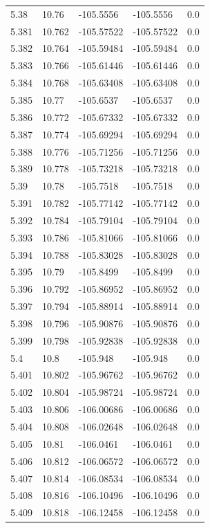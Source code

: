 \begin{tabular}{lllll}
5.38 & 10.76 & -105.5556 & -105.5556 & 0.0 \\
5.381 & 10.762 & -105.57522 & -105.57522 & 0.0 \\
5.382 & 10.764 & -105.59484 & -105.59484 & 0.0 \\
5.383 & 10.766 & -105.61446 & -105.61446 & 0.0 \\
5.384 & 10.768 & -105.63408 & -105.63408 & 0.0 \\
5.385 & 10.77 & -105.6537 & -105.6537 & 0.0 \\
5.386 & 10.772 & -105.67332 & -105.67332 & 0.0 \\
5.387 & 10.774 & -105.69294 & -105.69294 & 0.0 \\
5.388 & 10.776 & -105.71256 & -105.71256 & 0.0 \\
5.389 & 10.778 & -105.73218 & -105.73218 & 0.0 \\
5.39 & 10.78 & -105.7518 & -105.7518 & 0.0 \\
5.391 & 10.782 & -105.77142 & -105.77142 & 0.0 \\
5.392 & 10.784 & -105.79104 & -105.79104 & 0.0 \\
5.393 & 10.786 & -105.81066 & -105.81066 & 0.0 \\
5.394 & 10.788 & -105.83028 & -105.83028 & 0.0 \\
5.395 & 10.79 & -105.8499 & -105.8499 & 0.0 \\
5.396 & 10.792 & -105.86952 & -105.86952 & 0.0 \\
5.397 & 10.794 & -105.88914 & -105.88914 & 0.0 \\
5.398 & 10.796 & -105.90876 & -105.90876 & 0.0 \\
5.399 & 10.798 & -105.92838 & -105.92838 & 0.0 \\
5.4 & 10.8 & -105.948 & -105.948 & 0.0 \\
5.401 & 10.802 & -105.96762 & -105.96762 & 0.0 \\
5.402 & 10.804 & -105.98724 & -105.98724 & 0.0 \\
5.403 & 10.806 & -106.00686 & -106.00686 & 0.0 \\
5.404 & 10.808 & -106.02648 & -106.02648 & 0.0 \\
5.405 & 10.81 & -106.0461 & -106.0461 & 0.0 \\
5.406 & 10.812 & -106.06572 & -106.06572 & 0.0 \\
5.407 & 10.814 & -106.08534 & -106.08534 & 0.0 \\
5.408 & 10.816 & -106.10496 & -106.10496 & 0.0 \\
5.409 & 10.818 & -106.12458 & -106.12458 & 0.0 \\

\end{tabular}

